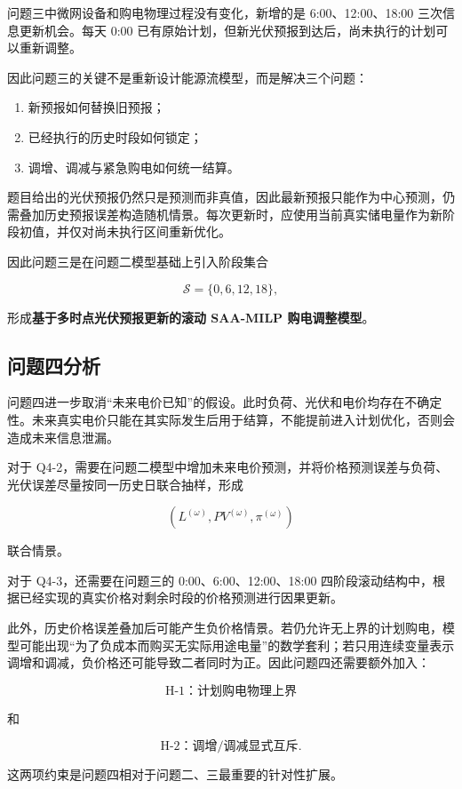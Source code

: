 问题三中微网设备和购电物理过程没有变化，新增的是 6:00、12:00、18:00 三次信息更新机会。每天 0:00 已有原始计划，但新光伏预报到达后，尚未执行的计划可以重新调整。

因此问题三的关键不是重新设计能源流模型，而是解决三个问题：

\begin{enumerate}
\item 新预报如何替换旧预报；
\item 已经执行的历史时段如何锁定；
\item 调增、调减与紧急购电如何统一结算。
\end{enumerate}

题目给出的光伏预报仍然只是预测而非真值，因此最新预报只能作为中心预测，仍需叠加历史预报误差构造随机情景。每次更新时，应使用当前真实储电量作为新阶段初值，并仅对尚未执行区间重新优化。

因此问题三是在问题二模型基础上引入阶段集合

\[
\mathcal S=\{0,6,12,18\},
\]

形成\textbf{基于多时点光伏预报更新的滚动 SAA-MILP 购电调整模型}。

\subsection{问题四分析}

问题四进一步取消“未来电价已知”的假设。此时负荷、光伏和电价均存在不确定性。未来真实电价只能在其实际发生后用于结算，不能提前进入计划优化，否则会造成未来信息泄漏。

对于 Q4-2，需要在问题二模型中增加未来电价预测，并将价格预测误差与负荷、光伏误差尽量按同一历史日联合抽样，形成

\[
(L^{(\omega)},PV^{(\omega)},\pi^{(\omega)})
\]

联合情景。

对于 Q4-3，还需要在问题三的 0:00、6:00、12:00、18:00 四阶段滚动结构中，根据已经实现的真实价格对剩余时段的价格预测进行因果更新。

此外，历史价格误差叠加后可能产生负价格情景。若仍允许无上界的计划购电，模型可能出现“为了负成本而购买无实际用途电量”的数学套利；若只用连续变量表示调增和调减，负价格还可能导致二者同时为正。因此问题四还需要额外加入：

\[
\text{H-1：计划购电物理上界}
\]

和

\[
\text{H-2：调增/调减显式互斥}.
\]

这两项约束是问题四相对于问题二、三最重要的针对性扩展。

